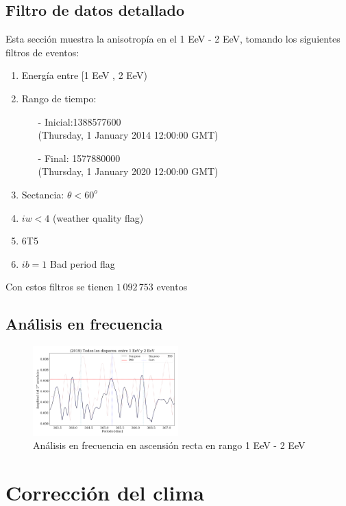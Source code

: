 \subsection{Filtro de datos detallado}
Esta sección muestra la anisotropía en el 1 EeV - 2 EeV, tomando los siguientes filtros de eventos:

\begin{enumerate}
	\item Energía entre  [1 EeV , 2 EeV)
	\item Rango de tiempo:
	\begin{itemize}
		\item[-] Inicial:1388577600 \\ (Thursday, 1 January 2014 12:00:00 GMT)
		\item[-] Final: 1577880000  \\ (Thursday, 1 January 2020 12:00:00 GMT)
	\end{itemize}
	\item Sectancia:  $\theta < 60^o$
	\item $iw<4$ (weather quality flag)
	\item 6T5
	\item $ib=1$ Bad period flag
\end{enumerate}


Con estos filtros se tienen $1\,092\,753$ eventos

\subsection{Análisis en frecuencia}

\begin{figure}[H]
	\centering
	\includegraphics[width=0.5\textwidth]{2019_AllTriggers_1_2_EeV_con_vs_sin_peso.png}
	\caption{Análisis en frecuencia en ascensión recta en rango 1 EeV - 2 EeV}
	\label{fig:consin}
\end{figure}


\section{Corrección del clima}

